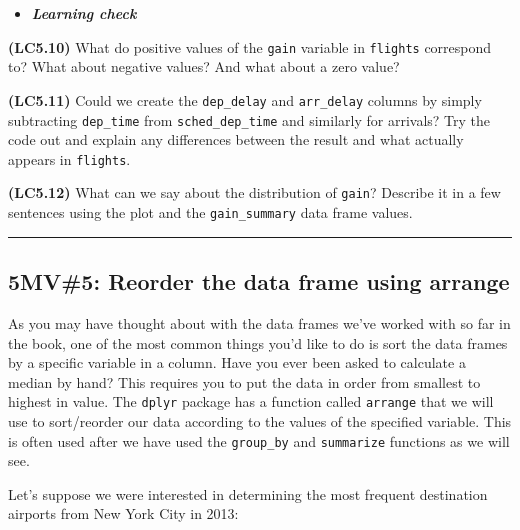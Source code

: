 \documentclass[]{tufte-book}
\newenvironment{Shaded}{\begin{snugshade}}{\end{snugshade}}
\newcommand{\KeywordTok}[1]{\textcolor[rgb]{0.13,0.29,0.53}{\textbf{{#1}}}}
\newcommand{\DataTypeTok}[1]{\textcolor[rgb]{0.13,0.29,0.53}{{#1}}}
\newcommand{\StringTok}[1]{\textcolor[rgb]{0.31,0.60,0.02}{{#1}}}
\newcommand{\NormalTok}[1]{{#1}}
\let\oldrule=\rule
\renewcommand{\rule}[1]{\oldrule{\linewidth}}
\newenvironment{rmdblock}[1]
  {\begin{shaded*}
  \begin{itemize}
  \renewcommand{\labelitemi}{
    \raisebox{-.7\height}[0pt][0pt]{
    }
  }
  \item
  }
  {
  \end{itemize}
  \end{shaded*}
  }
\newenvironment{learncheck}
  {\begin{rmdblock}{warning}}
  {\end{rmdblock}}
\begin{document}
\begin{learncheck}
\textbf{\emph{Learning check}}
\end{learncheck}

\textbf{(LC5.10)} What do positive values of the \texttt{gain} variable
in \texttt{flights} correspond to? What about negative values? And what
about a zero value?

\textbf{(LC5.11)} Could we create the \texttt{dep\_delay} and
\texttt{arr\_delay} columns by simply subtracting \texttt{dep\_time}
from \texttt{sched\_dep\_time} and similarly for arrivals? Try the code
out and explain any differences between the result and what actually
appears in \texttt{flights}.

\textbf{(LC5.12)} What can we say about the distribution of
\texttt{gain}? Describe it in a few sentences using the plot and the
\texttt{gain\_summary} data frame values.

\begin{center}\rule{0.5\linewidth}{\linethickness}\end{center}

\subsection{5MV\#5: Reorder the data frame using arrange}\label{arrange}

As you may have thought about with the data frames we've worked with so
far in the book, one of the most common things you'd like to do is sort
the data frames by a specific variable in a column. Have you ever been
asked to calculate a median by hand? This requires you to put the data
in order from smallest to highest in value. The \texttt{dplyr} package
has a function called \texttt{arrange} that we will use to sort/reorder
our data according to the values of the specified variable. This is
often used after we have used the \texttt{group\_by} and
\texttt{summarize} functions as we will see.

Let's suppose we were interested in determining the most frequent
destination airports from New York City in 2013:

\begin{Shaded}
\end{Shaded}
\end{document}
